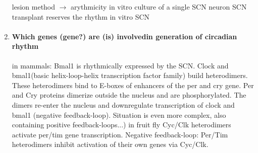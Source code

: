 \documentclass[12pt,article,oneside,a4paper]{memoir}
\begin{document}
\begin{enumerate}
lesion method $\rightarrow$ arythmicity
in vitro culture of a single SCN neuron    
SCN transplant reserves the rhythm
in vitro SCN

\item \paragraph{Which genes (gene?) are (is) involvedin generation of
circadian rhythm}

in mammals: Bmal1 is rhythmically expressed by the SCN. Clock and bmal1(basic
helix-loop-helix transcription factor family) build heterodimers. These
heterodimers bind to E-boxes of enhancers of the per and cry gene. Per and Cry
proteins dimerize outside the nucleus and are phosphorylated. The dimers
re-enter the nucleus and downregulate transcription of  clock and bmal1
(negative feedback-loop). Situation is even more complex, also containing
positive feedback-loops...)
in fruit fly Cyc/Clk heterodimers activate per/tim gene transcription. Negative
feedback-loop: Per/Tim heterodimers inhibit activation of their own genes via
Cyc/Clk.
\end{enumerate}

\end{document}
